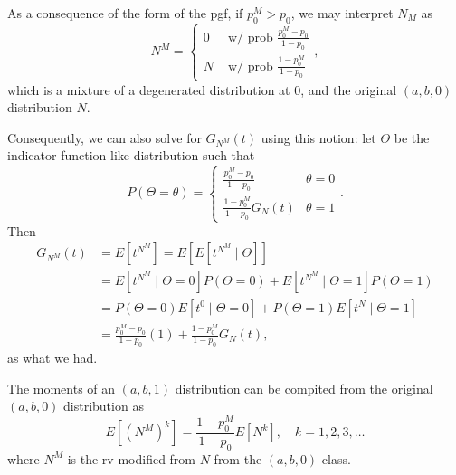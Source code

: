 \documentclass[notoc,notitlepage]{tufte-book}
\begin{document}
\begin{remark}
  As a consequence of the form of the pgf, if $p_0^M > p_0$, we may interpret $N_M$ as
  \begin{equation*}
    N^M = \begin{cases}
      0 & \text{ w/ prob } \frac{p_0^M - p_0}{1 - p_0} \\
      N & \text{ w/ prob } \frac{1 - p_0^M}{1 - p_0}
    \end{cases},
  \end{equation*}
  which is a mixture of a degenerated distribution at $0$, and the original $(a, b, 0)$ distribution $N$.

  Consequently, we can also solve for $G_{N^M}(t)$ using this notion: let $\Theta$ be the indicator-function-like distribution such that
  \begin{equation*}
    P(\Theta = \theta) = \begin{cases}
      \frac{p_0^M - p_0}{1 - p_0}      & \theta = 0 \\
      \frac{1 - p_0^M}{1 - p_0} G_N(t) & \theta = 1
    \end{cases}.
  \end{equation*}
  Then
  \begin{align*}
    G_{N^M}(t) &= E \left[ t^{N^M} \right] = E \left[ E \left[ t^{N^M} \mid \Theta \right] \right] \\
               &= E \left[ t^{N^M} \mid \Theta = 0 \right] P(\Theta = 0) + E \left[ t^{N^M} \mid \Theta = 1 \right] P(\Theta = 1) \\
               &= P(\Theta = 0) E \left[ t^0 \mid \Theta = 0 \right] + P(\Theta = 1) E \left[ t^N \mid \Theta = 1 \right] \\
               &= \frac{p_0^M - p_0}{1 - p_0} (1) + \frac{1 - p_0^M}{1 - p_0} G_N(t),
  \end{align*}
  as what we had.
\end{remark}

\begin{propo}\label{propo:moments_of_an_a_b_1_distribution}
  The moments of an $( a, b, 1 )$ distribution can be compited from the original $(a, b, 0)$ distribution as
  \begin{equation*}
    E \left[ \left( N^M \right)^k \right] = \frac{1 - p_0^M}{1 - p_0} E \left[ N^k \right], \quad k = 1, 2, 3, \ldots
  \end{equation*}
  where $N^M$ is the rv modified from $N$ from the $(a, b, 0)$ class.
\end{propo}
\end{document}
